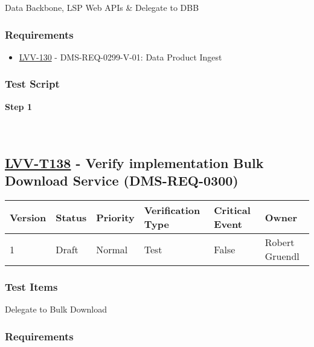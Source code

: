 Data Backbone, LSP Web APIs \& Delegate to DBB

\hypertarget{requirements-37}{%
\subsubsection{Requirements}\label{requirements-37}}

\begin{itemize}
\tightlist
\item
  \href{https://jira.lsstcorp.org/browse/LVV-130}{LVV-130} -
  DMS-REQ-0299-V-01: Data Product Ingest
\end{itemize}

\hypertarget{test-script-37}{%
\subsubsection{Test Script}\label{test-script-37}}

\textbf{Step 1}\\
~\\
~\\

\hypertarget{lvv-t138---verify-implementation-bulk-download-service-dms-req-0300}{%
\subsection{\texorpdfstring{\href{https://jira.lsstcorp.org/secure/Tests.jspa\#/testCase/LVV-T138}{LVV-T138}
- Verify implementation Bulk Download Service
(DMS-REQ-0300)}{LVV-T138 - Verify implementation Bulk Download Service (DMS-REQ-0300)}}\label{lvv-t138---verify-implementation-bulk-download-service-dms-req-0300}}

\begin{longtable}[]{@{}llllll@{}}
\toprule
Version & Status & Priority & Verification Type & Critical Event &
Owner\tabularnewline
\midrule
\endhead
1 & Draft & Normal & Test & False & Robert Gruendl\tabularnewline
\bottomrule
\end{longtable}

\hypertarget{test-items-38}{%
\subsubsection{Test Items}\label{test-items-38}}

Delegate to Bulk Download

\hypertarget{requirements-38}{%
\subsubsection{Requirements}\label{requirements-38}}

